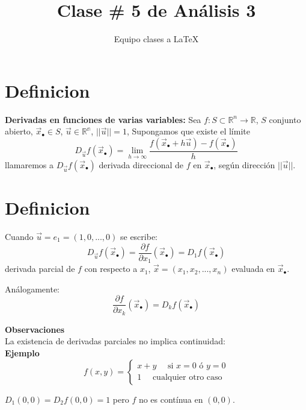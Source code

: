 \documentclass[12pt]{article}
\title{Clase \# 5 de Análisis 3}
\author{Equipo clases a \LaTeX}
\newcommand{\definicion}{\section{Definicion}}
\begin{document}
	
	\maketitle
	
	
	\definicion \textbf{Derivadas en funciones de varias variables:}
	Sea $f: S\subset \mathbb{R}^n\rightarrow \mathbb{R}$, $S$ conjunto abierto, $\vec{x}_\bullet \in S$, $\vec{u}\in \mathbb{R^n}$, $||\vec{u}||=1$, Supongamos que existe el límite 
	$$D_{\vec{u}}f(\vec{x}_\bullet)=\lim_{h\rightarrow \infty}\frac{f(\vec{x}_\bullet+h\vec{u})-f(\vec{x}_\bullet)}{h}$$
	llamaremos a $D_{\vec{u}}f(\vec{x}_\bullet)$ derivada direccional de $f$ en $\vec{x}_\bullet$, según dirección $||\vec{u}||$.
	\definicion
	Cuando $\vec{u}=e_1=(1,0,...,0)$ se escribe:
	$$D_{\vec{u}}f(\vec{x}_\bullet)=\frac{\partial f}{\partial x_1}(\vec{x}_\bullet)=D_1f(\vec{x}_\bullet)$$
	derivada parcial de $f$ con respecto a $x_1$, $\vec{x}=(x_1,x_2,...,x_n)$ evaluada en $\vec{x}_\bullet$.
	
	Análogamente:
	$$\frac{\partial f}{\partial x_k}(\vec{x}_\bullet)=D_kf(\vec{x}_\bullet)$$

	
\textbf{Observaciones}\\

La existencia de derivadas parciales no implica continuidad:\\

\textbf{Ejemplo}
$$f(x,y)=
\begin{cases}
x+y \quad \text{ si } x=0 \text{ ó } y=0\\
1  \quad \text{ cualquier otro caso }
\end{cases}$$

$D_1(0,0)=D_2f(0,0)=1$ pero $f$ no es contínua en  $(0,0)$.
\end{document}
